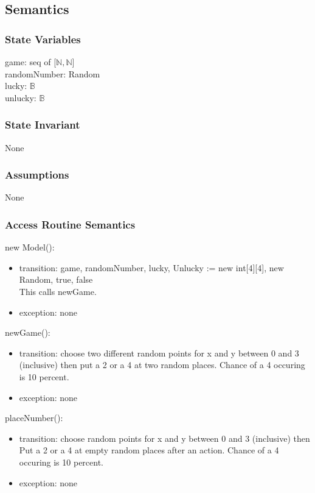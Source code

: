 \documentclass[12pt]{article}
\begin{document}
\subsection* {Semantics}

\subsubsection* {State Variables}

game: seq of [$\mathbb{N},\mathbb{N}$]\\
randomNumber: Random\\
lucky: $\mathbb{B}$\\
unlucky: $\mathbb{B}$\\

\subsubsection* {State Invariant}

None

\subsubsection* {Assumptions}

None

\subsubsection* {Access Routine Semantics}

\noindent new Model():
\begin{itemize}
\item transition: game, randomNumber, lucky, Unlucky := new int[4][4], new Random, true, false\\
This calls newGame.
\item exception: none
\end{itemize}

\noindent newGame():
\begin{itemize}
  \item transition: choose two different random points for x and y between 0 and 3 (inclusive) then put a 2 or a 4 at two random places. Chance of a 4 occuring is 10 percent.
  \item exception: none
\end{itemize}

\noindent placeNumber():
\begin{itemize}
  \item transition: choose random points for x and y between 0 and 3 (inclusive) then Put a 2 or a 4 at empty random places after an action. Chance of a 4 occuring is 10 percent. 
  \item exception: none
\end{itemize}
\end{document}
